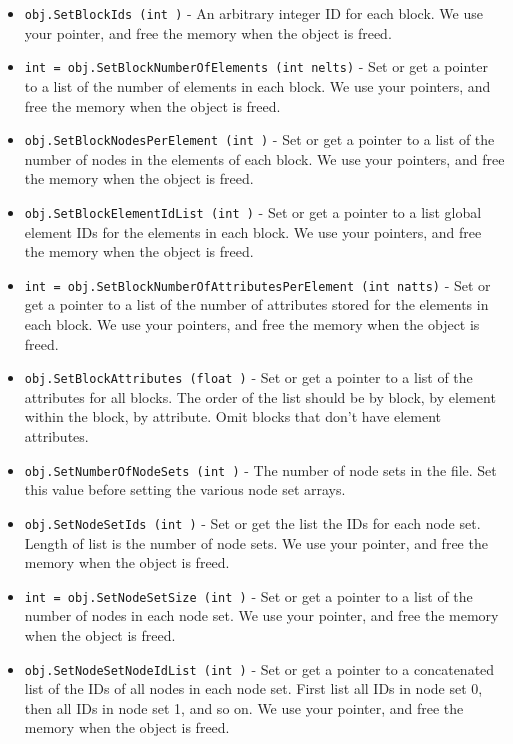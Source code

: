\begin{itemize}
\item  \verb|obj.SetBlockIds (int )| -    An arbitrary integer ID for each block.
   We use your pointer, and free the memory when the object is freed.

\item  \verb|int = obj.SetBlockNumberOfElements (int nelts)| -    Set or get a pointer to a list of the number of elements in
   each block.
   We use your pointers, and free the memory when the object is freed.

\item  \verb|obj.SetBlockNodesPerElement (int )| -    Set or get a pointer to a list of the number of nodes in the
   elements of  each block.
   We use your pointers, and free the memory when the object is freed.

\item  \verb|obj.SetBlockElementIdList (int )| -    Set or get a pointer to a list global element IDs for the
   elements in each block. 
   We use your pointers, and free the memory when the object is freed.

\item  \verb|int = obj.SetBlockNumberOfAttributesPerElement (int natts)| -    Set or get a pointer to a list of the number of attributes
   stored for the elements in each block.
   We use your pointers, and free the memory when the object is freed.

\item  \verb|obj.SetBlockAttributes (float )| -     Set or get a pointer to a list of the attributes for all
    blocks.  The order of the list should be by block, by element
    within the block, by attribute.  Omit blocks that don't
    have element attributes.

\item  \verb|obj.SetNumberOfNodeSets (int )| -    The number of node sets in the file.  Set this value before
   setting the various node set arrays.

\item  \verb|obj.SetNodeSetIds (int )| -    Set or get the list the IDs for each node set.
   Length of list is the number of node sets.
   We use your pointer, and free the memory when the object is freed.

\item  \verb|int = obj.SetNodeSetSize (int )| -    Set or get a pointer to a list of the number of nodes in each node set.
   We use your pointer, and free the memory when the object is freed.

\item  \verb|obj.SetNodeSetNodeIdList (int )| -    Set or get a pointer to a concatenated list of the
   IDs of all nodes in each node set.  First list all IDs in
   node set 0, then all IDs in node set 1, and so on.
   We use your pointer, and free the memory when the object is freed.


\end{itemize}
